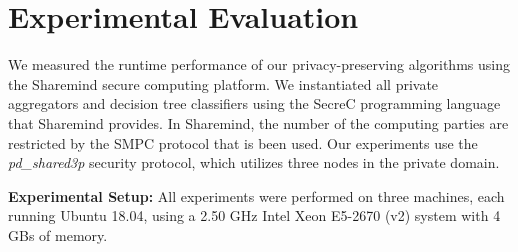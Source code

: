 \chapter{Experimental Evaluation}\label{c:evaluations}



We measured the runtime performance of our privacy\hyp preserving algorithms using the Sharemind secure computing platform.
We instantiated all private aggregators and decision tree classifiers using the SecreC programming language \cite{jagomagis2010secrec} that Sharemind provides.
In Sharemind, the number of the computing parties are restricted by the SMPC protocol that is been used.
Our experiments use the \textit{pd\_shared3p} security protocol, which utilizes three nodes in the private domain.


\textbf{Experimental Setup:}
All experiments were performed on three machines, each running Ubuntu 18.04, using a 2.50 GHz Intel Xeon E5-2670 (v2) system with 4 GBs of memory.






